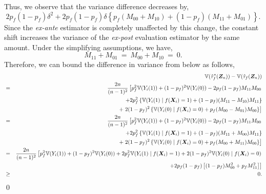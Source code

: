 \documentclass[USenglish,onecolumn]{article}
\renewcommand\r{\right}
\renewcommand\l{\left}
\newcommand\E{\mathbb{E}}
\newcommand\V{\mathbb{V}}
\newcommand\bX{\bm{X}}
\newcommand\bZ{\bm{Z}}
\begin{document}
Thus, we observe that the variance difference decreases by,
\begin{equation*}
	2 p_f(1-p_f) \delta^2  + 2p_f(1-p_f)\delta
	\l\{p_f(M_{00}+M_{10})+(1-p_f)(M_{11}+M_{01})\r\}.
\end{equation*}
Since the \textit{ex-ante} estimator is completely unaffected by this
change, the constant shift increases the variance of the
\textit{ex-post} evaluation estimator by the same amount.  Under the
simplifying assumptions, we have,
\begin{equation*}
	M_{11}+M_{01} \ = \ M_{00}+M_{10} \ = \  0.
\end{equation*}
Therefore, we can bound the difference in variance from below as follows,
\begin{eqnarray*}
	& & \V(\hat{\tau}_f^\ast(\bZ_n))-\V(\hat{\tau}_f(\bZ_n))  \\
	& = & \frac{2n}{(n-1)^2}\l[p_f^2\V(Y_i(1))+(1-p_f)^2\V(Y_i(0))
	-2p_f(1-p_f)M_{11}M_{00}  \r. \\ &  & \hspace{.5in}+  2 p_f^2 \l\{\V(Y_i(1) \mid f(\bX_i) = 1) + (1-p_f)(M_{11}-M_{10}) M_{11}\r\} \\
	& & \hspace{.5in} +  \l. 2 (1-p_f)^2 \l\{\V(Y_i(0) \mid f(\bX_i) = 0)+ p_f(M_{00}-M_{01}) M_{00}\r\} \r]\\
	& = & \frac{2n}{(n-1)^2}\l[p_f^2\V(Y_i(1))+(1-p_f)^2\V(Y_i(0))
	-2p_f(1-p_f)M_{11}M_{00}  \r. \\ &  & \hspace{.5in}+  2 p_f^2 \l\{\V(Y_i(1) \mid f(\bX_i) = 1) + (1-p_f)(M_{11}+M_{00}) M_{11}\r\} \\
	& & \hspace{.5in} +  \l. 2 (1-p_f)^2 \l\{\V(Y_i(0) \mid f(\bX_i) = 0)+ p_f(M_{00}+M_{11}) M_{00}\r\} \r]\\
	& = & \frac{2n}{(n-1)^2}\l[p_f^2\V(Y_i(1))+(1-p_f)^2\V(Y_i(0))
	+2p_f^2\V(Y_i(1) \mid f(\bX_i)=1) + 2(1-p_f)^2\V(Y_i(0) \mid f(\bX_i)=0) \r.\\
	& & \l. +2p_f(1-p_f)\l[(1-p_f)M_{00}^2+p_fM_{11}^2\r] \r] \\
	& \geq & 0.
\end{eqnarray*}
\qed
\end{document}
